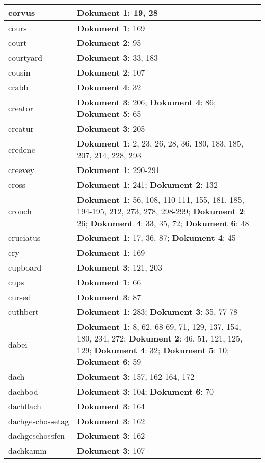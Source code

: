 \documentclass[a5paper]{article}
\begin{document}
\begin{longtable}[l]{|l|p{3in}|}
\hline
corvus & \textbf{Dokument 1}: 19, 28 \\
\hline
cours & \textbf{Dokument 1}: 169 \\
\hline
court & \textbf{Dokument 2}: 95 \\
\hline
courtyard & \textbf{Dokument 3}: 33, 183 \\
\hline
cousin & \textbf{Dokument 2}: 107 \\
\hline
crabb & \textbf{Dokument 4}: 32 \\
\hline
creator & \textbf{Dokument 3}: 206; \textbf{Dokument 4}: 86; \textbf{Dokument 5}: 65 \\
\hline
creatur & \textbf{Dokument 3}: 205 \\
\hline
credenc & \textbf{Dokument 1}: 2, 23, 26, 28, 36, 180, 183, 185, 207, 214, 228, 293 \\
\hline
creevey & \textbf{Dokument 1}: 290-291 \\
\hline
cross & \textbf{Dokument 1}: 241; \textbf{Dokument 2}: 132 \\
\hline
crouch & \textbf{Dokument 1}: 56, 108, 110-111, 155, 181, 185, 194-195, 212, 273, 278, 298-299; \textbf{Dokument 2}: 26; \textbf{Dokument 4}: 33, 35, 72; \textbf{Dokument 6}: 48 \\
\hline
cruciatus & \textbf{Dokument 1}: 17, 36, 87; \textbf{Dokument 4}: 45 \\
\hline
cry & \textbf{Dokument 1}: 169 \\
\hline
cupboard & \textbf{Dokument 3}: 121, 203 \\
\hline
cups & \textbf{Dokument 1}: 66 \\
\hline
cursed & \textbf{Dokument 3}: 87 \\
\hline
cuthbert & \textbf{Dokument 1}: 283; \textbf{Dokument 3}: 35, 77-78 \\
\hline
dabei & \textbf{Dokument 1}: 8, 62, 68-69, 71, 129, 137, 154, 180, 234, 272; \textbf{Dokument 2}: 46, 51, 121, 125, 129; \textbf{Dokument 4}: 32; \textbf{Dokument 5}: 10; \textbf{Dokument 6}: 59 \\
\hline
dach & \textbf{Dokument 3}: 157, 162-164, 172 \\
\hline
dachbod & \textbf{Dokument 3}: 104; \textbf{Dokument 6}: 70 \\
\hline
dachflach & \textbf{Dokument 3}: 164 \\
\hline
dachgeschossetag & \textbf{Dokument 3}: 162 \\
\hline
dachgeschossfen & \textbf{Dokument 3}: 162 \\
\hline
dachkamm & \textbf{Dokument 3}: 107 \\

\end{longtable}
\end{document}
